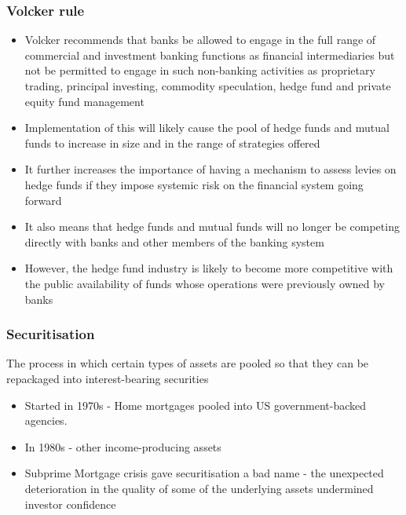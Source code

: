 \documentclass[11pt]{beamer}
\begin{document}
\begin{frame}
\frametitle{Volcker rule}
\begin{itemize}
\item Volcker recommends that banks be allowed to engage in the full range of commercial and investment banking functions as financial intermediaries but not be permitted to engage in such non-banking activities as proprietary trading, principal investing, commodity
speculation, hedge fund and private equity fund management
\item Implementation of this will likely cause the pool of hedge funds and mutual funds to increase in size and in the range of strategies offered
\item It further increases the importance of having a mechanism to assess levies on hedge funds if they impose systemic risk on the financial system going forward
\item It also means that hedge funds and mutual funds will no longer be competing directly with banks and other members of the banking system
\item However, the hedge fund industry is likely to become more competitive with the public availability of funds whose operations were previously owned by banks
\end{itemize}
\end{frame}




\begin{frame}
\begin{center}
\end{center}
\end{frame}

\begin{frame}
\frametitle{Securitisation}
The process in which certain types of assets are pooled so that they can be repackaged into interest-bearing securities
\begin{itemize}
\item Started in 1970s - Home mortgages pooled into US government-backed agencies.
\item In 1980s - other income-producing assets
\item Subprime Mortgage crisis gave securitisation a bad name -  the unexpected deterioration in the quality of some of the underlying assets undermined investor confidence
\end{itemize}
\end{frame}
\end{document}
